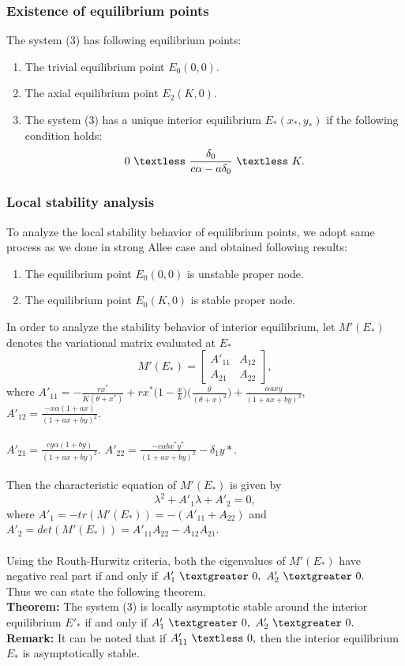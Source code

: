 \documentclass[a4paper, 10pt]{article}
\begin{document}
	\subsubsection{Existence of equilibrium points}
	The system (3) has following equilibrium points:
	\begin{enumerate}
		\item The trivial equilibrium point $E_0(0,0).$
		\item The axial equilibrium point $E_2(K,0).$
		\item The system (3) has a unique interior equilibrium $E_*(x_*,y_*)$ if the following condition holds:
		\[0~ \textless ~\frac{\delta_0}{c\alpha-a\delta_0}~ \textless~ K.\]
	\end{enumerate}
	\subsubsection{Local stability analysis}
	To analyze the local stability behavior of equilibrium points, we adopt same process as we done in strong Allee case and obtained following results:
	\begin{enumerate}
		\item The equilibrium point $E_0(0,0)$ is unstable proper node.
		\item The equilibrium point $E_0(K,0)$ is stable proper node.
	\end{enumerate}
	In order to analyze the stability behavior of interior equilibrium, let $M'(E_*)$ denotes the variational matrix evaluated at $E_*$ 
	\[M'(E_*)=\begin{bmatrix}
	A'_{11}&A_{12}\\A_{21}&A_{22}
	\end{bmatrix},\]
	where $A'_{11}=-\frac{rx^*}{K(\theta+x^*)}+rx^*\Big(1-\frac{x}{k}\Big)\Big(\frac{\theta}{(\theta+x)^2}\Big)+\frac{\alpha axy}{(1+ax+by)^2},$
	$A'_{12}=\frac{-x\alpha(1+ax)}{(1+ax+by)^2}.$\\ \\
	$A'_{21}=\frac{cy\alpha(1+by)}{(1+ax+by)^2}.$
	$A'_{22}=\frac{-c\alpha bx^*y^*}{(1+ax+by)^2}-\delta_1 y*.$\\ \\
	Then the characteristic equation of $M'(E_*)$ is given by
	\begin{equation}
	\lambda^2+A'_1\lambda+A'_2=0,
	\end{equation}
	where $A'_1=-tr(M'(E_*))=-(A'_{11}+A_{22})$ and $A'_2=det(M'(E_*))=A'_{11}A_{22}-A_{12}A_{21}.$\\\\
	Using the Routh-Hurwitz criteria, both the eigenvalues of $M'(E_*)$ have negative real part if and only if $A'_1~\textgreater~0,~A'_2~\textgreater~0.$\\
	\medskip Thus we can state the following theorem.\\ 
	\textbf{Theorem:} The system (3) is locally asymptotic stable around the interior equilibrium $E'_*$ if and only if $A'_1~\textgreater~0,~A'_2~\textgreater~0.$\\
	\textbf{Remark:} It can be noted that if $A'_{11}~\textless~0,$ then the interior equilibrium $E_*$ is asymptotically stable.\\\\
\end{document}
